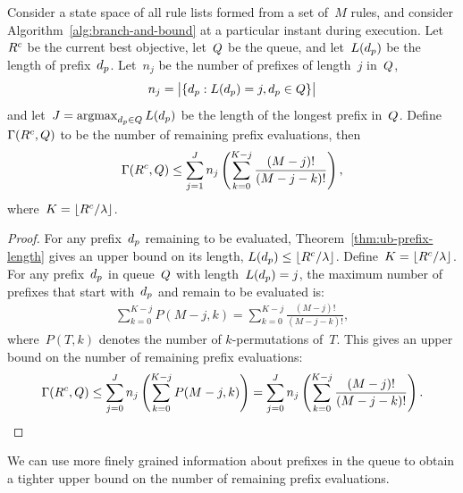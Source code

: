 \begin{corollary}
Consider a state space of all rule lists formed from a set of~$M$ rules,
and consider Algorithm~\ref{alg:branch-and-bound} at a particular instant
during execution.
%
Let~${R^c}$ be the current best objective, let~$Q$ be the queue,
and let~$L(d_p)$ be the length of prefix~$d_p$.
%
Let~$n_j$ be the number of prefixes of length~$j$ in~$Q$,
\begin{align}
n_j = \big | \{ \Prefix : L(\Prefix) = j, \Prefix \in \Queue \} \big |
\end{align}
and let~${J = \operatorname*{argmax}_{d_p \in Q} L(d_p)}$
be the length of the longest prefix in~$Q$.
%
Define~${\Gamma({R^c}, Q)}$ to be the number of remaining
prefix evaluations, then
\begin{align}
\Remaining(\CurrentObj, \Queue)
\le \sum_{j=1}^J n_j \left( \sum_{k=0}^{K-j} \frac{(M-j)!}{(M-j - k)!} \right),
\end{align}
where~${K = \lfloor {R^c} / {\lambda} \rfloor}$.
\end{corollary}

\begin{proof}
For any prefix~$d_p$ remaining to be evaluated,
Theorem~\ref{thm:ub-prefix-length} gives an upper bound on its length,
${L(d_p) \le \lfloor {R^c} / {\lambda} \rfloor}$.
%
Define~${K = \lfloor {R^c} / {\lambda} \rfloor}$.
%
For any prefix~$d_p$ in queue~$Q$ with length~${L(d_p) = j}$,
the maximum number of prefixes that start with~$d_p$
and remain to be evaluated is:
\begin{align}
\sum_{k=0}^{K-j} P(M-j, k) = \sum_{k=0}^{K-j} \frac{(M-j)!}{(M-j - k)!},
\end{align}
where~${P(T, k)}$ denotes the number of $k$-permutations of~$T$.
%
This gives an upper bound on the number of remaining prefix evaluations:
\begin{align}
\Remaining(\CurrentObj, \Queue)
\le \sum_{j=0}^J n_j \left( \sum_{k=0}^{K-j} P(M-j, k) \right)
= \sum_{j=0}^J n_j \left( \sum_{k=0}^{K-j} \frac{(M-j)!}{(M-j - k)!} \right).
\end{align}
\end{proof}

We can use more finely grained information about prefixes in the queue
to obtain a tighter upper bound on the number of remaining prefix evaluations.

